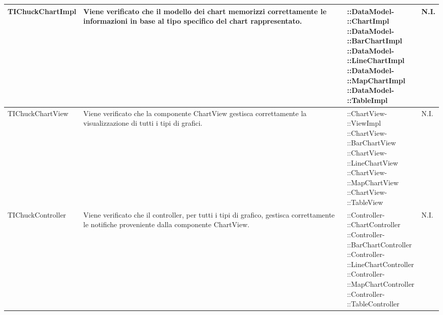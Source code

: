 \begin{longtabu}{| X | X | X[0.9] | X[0.3] |}
	TIChuckChartImpl
				&
Viene verificato che il modello dei chart memorizzi correttamente le informazioni in base al tipo specifico del chart rappresentato.
			& \parbox[t]{0.6\textwidth}{
::DataModel-\\::ChartImpl\\
::DataModel-\\::BarChartImpl\\
::DataModel-\\::LineChartImpl\\
::DataModel-\\::MapChartImpl\\
::DataModel-\\::TableImpl}
			& N.I.
			\\ \hline



	TIChuckChartView
				&
Viene verificato che la componente ChartView gestisca correttamente la visualizzazione di tutti i tipi di grafici.
			& \parbox[t]{0.6\textwidth}{
::ChartView-\\::ViewImpl\\
::ChartView-\\::BarChartView\\
::ChartView-\\::LineChartView\\
::ChartView-\\::MapChartView\\
::ChartView-\\::TableView}
			& N.I.
			\\ \hline



	TIChuckController
				&
Viene verificato che il controller, per tutti i tipi di grafico, gestisca correttamente le notifiche proveniente dalla componente ChartView.
			& \parbox[t]{0.6\textwidth}{
::Controller-\\::ChartController\\
::Controller-\\::BarChartController\\
::Controller-\\::LineChartController\\
::Controller-\\::MapChartController\\
::Controller-\\::TableController}
			& N.I.
			\\ \hline




\end{longtabu}
